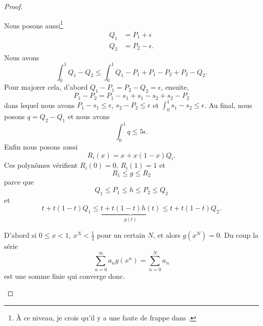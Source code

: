 \begin{proof}
\begin{subproof}
		Nous posons aussi\footnote{À ce niveau, je crois qu'il y a une faute de frappe dans \cite{ytMOpe}.}
		\begin{subequations}
			\begin{align}
				Q_1 & =P_1+\epsilon  \\
				Q_2 & =P_2-\epsilon.
			\end{align}
		\end{subequations}
		Nous avons
		\begin{equation}
			\int_0^1Q_1-Q_2\leq\int_0^1 Q_1-P_1+P_1-P_2+P_2-Q_2.
		\end{equation}
		Pour majorer cela, d'abord \( Q_1-P_1=P_2-Q_2=\epsilon\), ensuite,
		\begin{equation}
			P_1-P_2=P_1-s_1+s_1-s_2+s_2-P_2
		\end{equation}
		dans lequel nous avons \( P_1-s_1\leq \epsilon\), \( s_2-P_2\leq \epsilon\) et \( \int_0^1s_1-s_2\leq\epsilon\). Au final, nous posons \( q=Q_2-Q_1\) et nous avons
		\begin{equation}
			\int_0^1q\leq 5\epsilon.
		\end{equation}
		Enfin nous posons aussi
		\begin{equation}
			R_i(x)=x+x(1-x)Q_i.
		\end{equation}
		Ces polynômes vérifient \( R_i(0)=0\), \( R_i(1)=1\) et
		\begin{equation}
			R_1\leq g\leq R_2
		\end{equation}
		parce que
		\begin{equation}
			Q_1\leq P_1\leq h\leq  P_2\leq Q_2
		\end{equation}
		et
		\begin{equation}
			t+t(1-t)Q_1\leq \underbrace{t+t(1-t)h(t)}_{g(t)}\leq t+t(1-t)Q_2.
		\end{equation}

		D'abord si \( 0\leq x<1\), \( x^N<\frac{ 1 }{2}\) pour un certain \( N\), et alors \( g(x^N)=0\). Du coup la série
		\begin{equation}
			\sum_{n=0}^{\infty}a_ng(x^n)=\sum_{n=0}^{N}a_n
		\end{equation}
		est une somme finie qui converge donc.


\end{subproof}
\end{proof}
